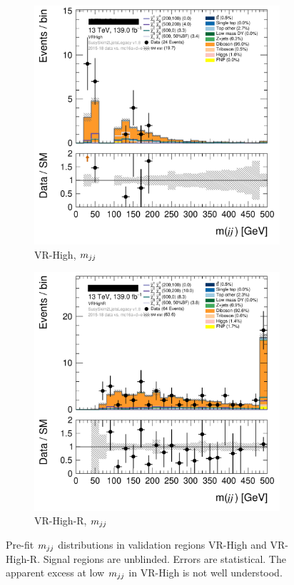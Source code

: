 \begin{figure}[tp]
\centering
\begin{subfigure}{0.495\textwidth}
\centering
\includegraphics[width=\textwidth]{figures/2ljets_def_mjj_VRHigh.png}
\caption{VR-High, $\mjj$}
\end{subfigure}
\hfill
\begin{subfigure}{0.495\textwidth}
\centering
\includegraphics[width=\textwidth]{figures/2ljets_def_mjj_VRHighR.png}
\caption{VR-High-R, $\mjj$}
\end{subfigure}
\caption[
Pre-fit $\mjj$ distributions in validation regions VR-High and VR-High-R
]{%
Pre-fit $\mjj$ distributions in validation regions VR-High and VR-High-R.
Signal regions are unblinded.
Errors are statistical.
The apparent excess at low $\mjj$ in VR-High is not well understood.
}
\label{fig:2ljets_high_mjj_vrhigh}
\end{figure}

